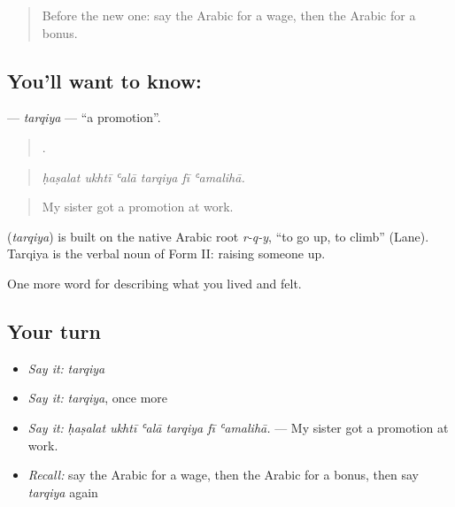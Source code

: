 \label{lesson:AR-C521-tarqiya}



\begin{quote}
Before the new one: say the Arabic for a wage, then the Arabic for a bonus.
\end{quote}

\subsection*{You'll want to know: }
\textbf{} — \emph{tarqiya} — \textquotedblleft{}a promotion\textquotedblright{}.

\begin{quote}
     .
\end{quote}

\begin{quote}
\emph{ḥaṣalat ukhtī ʿalā tarqiya fī ʿamalihā.}
\end{quote}

\begin{quote}
My sister got a promotion at work.
\end{quote}

\begin{cousinweb}
\textbf{} (\emph{tarqiya}) is built on the native Arabic root \emph{r-q-y}, \textquotedblleft{}to go up, to climb\textquotedblright{} (Lane). Tarqiya is the verbal noun of Form II: raising someone up.
\end{cousinweb}

\begin{grammarlens}[title={What you've built}]
One more word for describing what you lived and felt.
\end{grammarlens}

\subsection*{Your turn}
\begin{itemize}
\raggedright
  \item \emph{Say it:} \emph{tarqiya}
  \item \emph{Say it:} \emph{tarqiya}, once more
  \item \emph{Say it:} \emph{ḥaṣalat ukhtī ʿalā tarqiya fī ʿamalihā.} — My sister got a promotion at work.
  \item \emph{Recall:} say the Arabic for a wage, then the Arabic for a bonus, then say \emph{tarqiya} again
\end{itemize}

